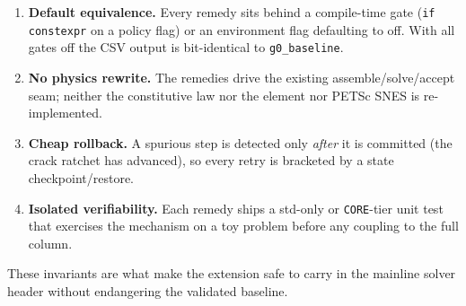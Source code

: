 \begin{enumerate}
  \item \textbf{Default equivalence.} Every remedy sits behind a
        compile-time gate (\texttt{if constexpr} on a policy flag) or an
        environment flag defaulting to off. With all gates off the CSV
        output is bit-identical to \texttt{g0\_baseline}.
  \item \textbf{No physics rewrite.} The remedies drive the existing
        assemble/solve/accept seam; neither the constitutive law nor the
        element nor PETSc SNES is re-implemented.
  \item \textbf{Cheap rollback.} A spurious step is detected only
        \emph{after} it is committed (the crack ratchet has advanced), so
        every retry is bracketed by a state checkpoint/restore.
  \item \textbf{Isolated verifiability.} Each remedy ships a std-only or
        \texttt{CORE}-tier unit test that exercises the mechanism on a toy
        problem before any coupling to the full column.
\end{enumerate}

These invariants are what make the extension safe to carry in the
mainline solver header without endangering the validated baseline.
